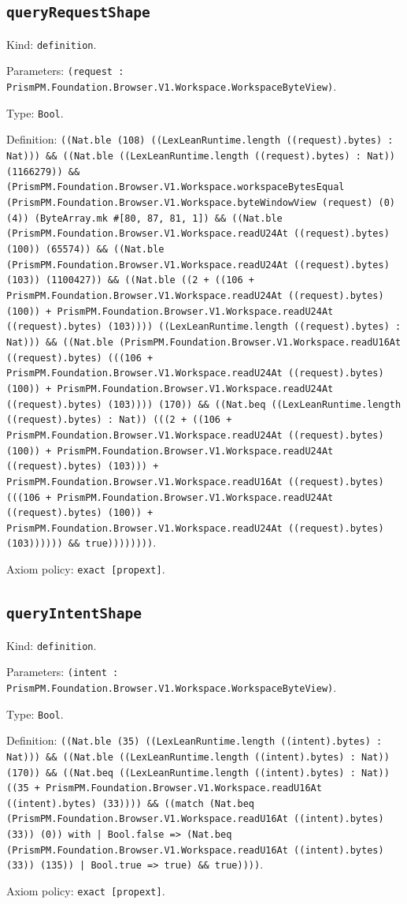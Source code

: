 \documentclass[11pt]{article}
\begin{document}
\subsection*{\texttt{queryRequestShape}}
\noindent Kind: \texttt{definition}.\par
\noindent Parameters: \texttt{(request : PrismPM.Foundation.Browser.V1.Workspace.WorkspaceByteView)}.\par
\noindent Type: \texttt{Bool}.\par
\noindent Definition: \texttt{((Nat.ble (108) ((LexLeanRuntime.length ((request).bytes) : Nat))) \&\& ((Nat.ble ((LexLeanRuntime.length ((request).bytes) : Nat)) (1166279)) \&\& (PrismPM.Foundation.Browser.V1.Workspace.workspaceBytesEqual (PrismPM.Foundation.Browser.V1.Workspace.byteWindowView (request) (0) (4)) (ByteArray.mk \#[80, 87, 81, 1]) \&\& ((Nat.ble (PrismPM.Foundation.Browser.V1.Workspace.readU24At ((request).bytes) (100)) (65574)) \&\& ((Nat.ble (PrismPM.Foundation.Browser.V1.Workspace.readU24At ((request).bytes) (103)) (1100427)) \&\& ((Nat.ble ((2 + ((106 + PrismPM.Foundation.Browser.V1.Workspace.readU24At ((request).bytes) (100)) + PrismPM.Foundation.Browser.V1.Workspace.readU24At ((request).bytes) (103)))) ((LexLeanRuntime.length ((request).bytes) : Nat))) \&\& ((Nat.ble (PrismPM.Foundation.Browser.V1.Workspace.readU16At ((request).bytes) (((106 + PrismPM.Foundation.Browser.V1.Workspace.readU24At ((request).bytes) (100)) + PrismPM.Foundation.Browser.V1.Workspace.readU24At ((request).bytes) (103)))) (170)) \&\& ((Nat.beq ((LexLeanRuntime.length ((request).bytes) : Nat)) (((2 + ((106 + PrismPM.Foundation.Browser.V1.Workspace.readU24At ((request).bytes) (100)) + PrismPM.Foundation.Browser.V1.Workspace.readU24At ((request).bytes) (103))) + PrismPM.Foundation.Browser.V1.Workspace.readU16At ((request).bytes) (((106 + PrismPM.Foundation.Browser.V1.Workspace.readU24At ((request).bytes) (100)) + PrismPM.Foundation.Browser.V1.Workspace.readU24At ((request).bytes) (103)))))) \&\& true))))))))}.\par
\noindent Axiom policy: \texttt{exact [propext]}.\par
\subsection*{\texttt{queryIntentShape}}
\noindent Kind: \texttt{definition}.\par
\noindent Parameters: \texttt{(intent : PrismPM.Foundation.Browser.V1.Workspace.WorkspaceByteView)}.\par
\noindent Type: \texttt{Bool}.\par
\noindent Definition: \texttt{((Nat.ble (35) ((LexLeanRuntime.length ((intent).bytes) : Nat))) \&\& ((Nat.ble ((LexLeanRuntime.length ((intent).bytes) : Nat)) (170)) \&\& ((Nat.beq ((LexLeanRuntime.length ((intent).bytes) : Nat)) ((35 + PrismPM.Foundation.Browser.V1.Workspace.readU16At ((intent).bytes) (33)))) \&\& ((match (Nat.beq (PrismPM.Foundation.Browser.V1.Workspace.readU16At ((intent).bytes) (33)) (0)) with | Bool.false => (Nat.beq (PrismPM.Foundation.Browser.V1.Workspace.readU16At ((intent).bytes) (33)) (135)) | Bool.true => true) \&\& true))))}.\par
\noindent Axiom policy: \texttt{exact [propext]}.\par
\end{document}
